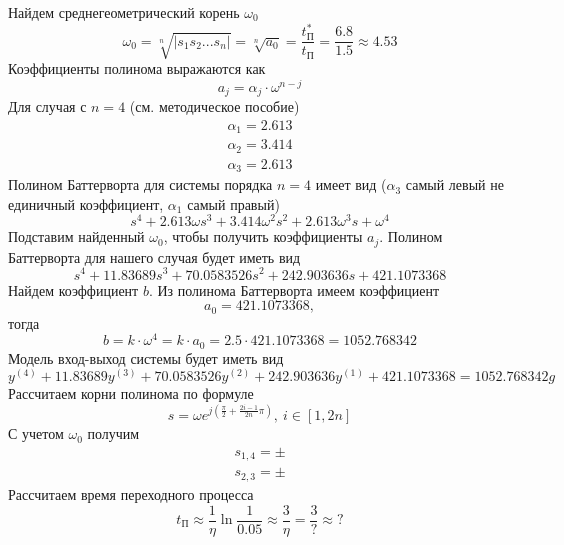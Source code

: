 \documentclass[a4paper, 12pt]{article}
\begin{document}
    \noindent Найдем среднегеометрический корень $\omega_0$
    $$\omega_0=\sqrt[n]{|s_1s_2...s_n|}=\sqrt[n]{a_0}=\dfrac{t^*_{\text{П}}}{t_{\text{П}}}=\dfrac{6.8}{1.5}\approx4.53$$
    Коэффициенты полинома выражаются как
    $$a_j=\alpha_j\cdot\omega^{n-j}$$
    Для случая с $n=4$ (см. методическое пособие)
    $$
    \begin{matrix}
    \alpha_1=2.613\\
    \alpha_2=3.414\\
    \alpha_3=2.613
    \end{matrix}
    $$
    Полином Баттерворта для системы порядка $n=4$ имеет вид ($\alpha_3$ самый левый не единичный коэффициент, $\alpha_1$ самый правый)
    $$s^4+2.613\omega s^3+3.414\omega^2s^2+2.613\omega^3s+\omega^4$$
    Подставим найденный $\omega_0$, чтобы получить коэффициенты $a_j$. Полином Баттерворта для нашего случая будет иметь вид
    $$s^4+11.83689s^3+70.0583526s^2+242.903636s+421.1073368$$
    Найдем коэффициент $b$. Из полинома Баттерворта имеем коэффициент $$a_0=421.1073368,$$
    тогда $$b=k\cdot\omega^4=k\cdot a_0=2.5\cdot421.1073368=1052.768342$$
    Модель вход-выход системы будет иметь вид
    $$y^{(4)}+11.83689y^{(3)}+70.0583526y^{(2)}+242.903636y^{(1)}+421.1073368=1052.768342g$$
    Рассчитаем корни полинома по формуле
    $$s=\omega e^{j\left(\frac{\pi}{2}+\frac{2i-1}{2n}\pi\right)},\ i\in[1,2n]$$
    С учетом $\omega_0$ получим
    $$
    \begin{matrix}
    s_{1,4}=\pm \\
    s_{2,3}=\pm
    \end{matrix}
    $$
    Рассчитаем время переходного процесса
    $$t_{\text{П}}\approx\dfrac{1}{\eta}\ln{\dfrac{1}{0.05}}\approx\dfrac{3}{\eta}=\dfrac{3}{?}\approx ?$$
\end{document}
